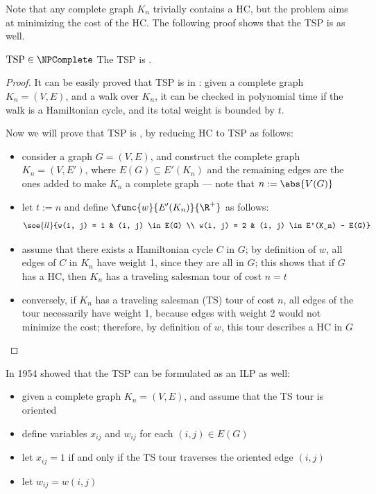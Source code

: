 \documentclass[a4paper, 12pt]{report}
\begin{document}
    Note that any complete graph $K_n$ trivially contains a HC, but the problem aims at minimizing the cost of the HC. The following proof shows that the TSP is \NPComplete as well.

    \begin{framedthm}[label={tsp np compl}]{$\mathrm{TSP} \in \NPComplete$}
        The TSP is \NPComplete.
    \end{framedthm}

    \begin{proof}
        It can be easily proved that TSP is in \NPclass: given a complete graph $K_n =(V, E)$, and a walk over $K_n$, it can be checked in polynomial time if the walk is a Hamiltonian cycle, and its total weight is bounded by $t$.

        Now we will prove that TSP is \NPHard, by reducing HC to TSP as follows:

        \begin{itemize}
            \item consider a graph $G = (V, E)$, and construct the complete graph $K_n = (V, E')$, where $E(G) \subseteq E'(K_n)$ and the remaining edges are the ones added to make $K_n$ a complete graph --- note that $n := \abs{V(G)}$
            \item let $t := n$ and define $\func{w}{E'(K_n)}{\R^+}$ as follows: $$\soe{ll}{w(i, j) = 1 & (i, j) \in E(G) \\ w(i, j) = 2 & (i, j) \in E'(K_n) - E(G)}$$
            \item assume that there exists a Hamiltonian cycle $C$ in $G$; by definition of $w$, all edges of $C$ in $K_n$ have weight 1, since they are all in $G$; this shows that if $G$ has a HC, then $K_n$ has a traveling salesman tour of cost $n = t$
            \item conversely, if $K_n$ has a traveling salesman (TS) tour of cost $n$, all edges of the tour necessarily have weight 1, because edges with weight 2 would not minimize the cost; therefore, by definition of $w$, this tour describes a HC in $G$
            \end{itemize}
    \end{proof}

    In 1954 \textcite{dantzig} showed that the TSP can be formulated as an ILP as well:

    \begin{itemize}
        \item given a complete graph $K_n = (V, E)$, and assume that the TS tour is oriented
        \item define variables $x_{ij}$ and $w_{ij}$ for each $(i, j) \in E(G)$
        \item let $x_{ij} = 1$ if and only if the TS tour traverses the oriented edge $(i, j)$
        \item let $w_{ij} = w(i, j)$
    \end{itemize}
\end{document}
